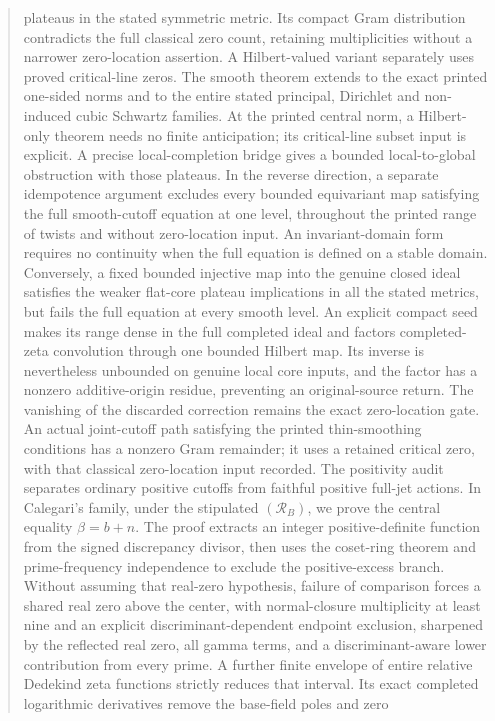 \documentclass[11pt,a4paper]{article}
\begin{document}
\begin{abstract}
plateaus in the stated symmetric metric. Its compact Gram
distribution contradicts the full classical zero count, retaining
multiplicities without a narrower zero-location assertion. A
Hilbert-valued variant separately uses proved critical-line zeros.
The smooth theorem extends to the exact printed one-sided norms
and to the entire stated principal, Dirichlet and non-induced
cubic Schwartz families. At the printed central norm, a
Hilbert-only theorem needs no finite anticipation; its
critical-line subset input is explicit. A precise local-completion
bridge gives a bounded local-to-global obstruction with those
plateaus. In the reverse direction, a separate idempotence
argument excludes every bounded equivariant map satisfying
the full smooth-cutoff equation at one level, throughout the
printed range of twists and without zero-location input.
An invariant-domain form requires no continuity when the full
equation is defined on a stable domain. Conversely, a fixed
bounded injective map into the genuine closed ideal satisfies
the weaker flat-core plateau implications in all the stated
metrics, but fails the full equation at every smooth level.
An explicit compact seed makes its range dense in the full
completed ideal and factors completed-zeta convolution through
one bounded Hilbert map. Its inverse is nevertheless unbounded
on genuine local core inputs, and the factor has a nonzero
additive-origin residue, preventing an original-source return.
The vanishing of the discarded correction remains the exact zero-location gate. An actual joint-cutoff path
satisfying the printed thin-smoothing conditions has a nonzero
Gram remainder; it uses a retained critical zero, with that
classical zero-location input recorded. The positivity
audit separates ordinary positive cutoffs from faithful positive
full-jet actions. In Calegari's family, under the stipulated
$(\mathcal R_B)$, we prove the central equality $\beta=b+n$.
The proof extracts an integer positive-definite function from the
signed discrepancy divisor, then uses the coset-ring theorem and
prime-frequency independence to exclude the positive-excess branch.
Without assuming that real-zero hypothesis, failure of comparison
forces a shared real zero above the center, with normal-closure
multiplicity at least nine and an explicit discriminant-dependent
endpoint exclusion, sharpened by the reflected real zero, all gamma
terms, and a discriminant-aware lower contribution from every prime.
A further finite envelope of entire relative Dedekind zeta
functions strictly reduces that interval. Its exact completed
logarithmic derivatives remove the base-field poles and zero

\end{abstract}
\end{document}
